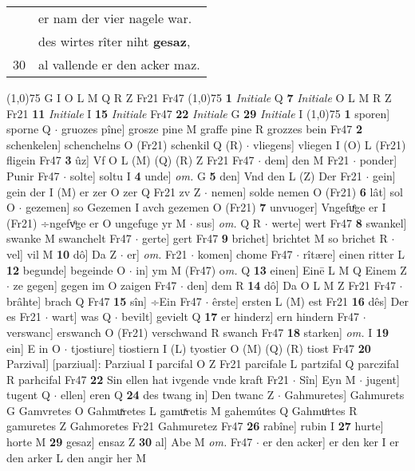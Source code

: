 \documentclass[8pt,a4paper,notitlepage]{article}
\begin{document}
\begin{table}[ht]
\begin{minipage}[t]{0.5\linewidth}
\begin{tabular}{rl}
 & er nam der vier nagele war.\\ 
 & des wirtes rîter niht \textbf{gesaz},\\ 
30 & al vallende er den acker maz.\\ 
\end{tabular}
\scriptsize
\line(1,0){75} \newline
G I O L M Q R Z Fr21 Fr47 \newline
\line(1,0){75} \newline
\textbf{1} \textit{Initiale} Q  \textbf{7} \textit{Initiale} O L M R Z Fr21  \textbf{11} \textit{Initiale} I  \textbf{15} \textit{Initiale} Fr47  \textbf{22} \textit{Initiale} G  \textbf{29} \textit{Initiale} I  \newline
\line(1,0){75} \newline
\textbf{1} sporen] sporne Q  $\cdot$ gruozes pîne] grosze pine M graffe pine R grozzes bein Fr47 \textbf{2} schenkelen] schenchelns O (Fr21) schenkil Q (R)  $\cdot$ vliegens] vliegen I (O) L (Fr21) fligein Fr47 \textbf{3} ûz] Vf O L (M) (Q) (R) Z Fr21 Fr47  $\cdot$ dem] den M Fr21  $\cdot$ ponder] Punir Fr47  $\cdot$ solte] soltu I \textbf{4} unde] \textit{om.} G \textbf{5} den] Vnd den L (Z) Der Fr21  $\cdot$ gein] gein der I (M) er zer O zer Q Fr21 zv Z  $\cdot$ nemen] solde nemen O (Fr21) \textbf{6} lât] sol O  $\cdot$ gezemen] so Gezemen I avch gezemen O (Fr21) \textbf{7} unvuoger] Vngefuͤge er I (Fr21) ÷ngefvͦge er O ungefuge yr M  $\cdot$ sus] \textit{om.} Q R  $\cdot$ werte] wert Fr47 \textbf{8} swankel] swanke M swanchelt Fr47  $\cdot$ gerte] gert Fr47 \textbf{9} brichet] brichtet M so brichet R  $\cdot$ vel] vil M \textbf{10} dô] Da Z  $\cdot$ er] \textit{om.} Fr21  $\cdot$ komen] chome Fr47  $\cdot$ rîtære] einen ritter L \textbf{12} begunde] begeinde O  $\cdot$ in] ym M (Fr47) o\textit{m. } Q \textbf{13} einen] Einē L M Q Einem Z  $\cdot$ ze gegen] gegen im O zaigen Fr47  $\cdot$ den] dem R \textbf{14} dô] Da O L M Z Fr21 Fr47  $\cdot$ brâhte] brach Q Fr47 \textbf{15} sîn] ÷Ein Fr47  $\cdot$ êrste] ersten L (M) est Fr21 \textbf{16} dês] Der es Fr21  $\cdot$ wart] was Q  $\cdot$ bevilt] gevielt Q \textbf{17} er hinderz] ern hindern Fr47  $\cdot$ verswanc] erswanch O (Fr21) verschwand R swanch Fr47 \textbf{18} starken] \textit{om.} I \textbf{19} ein] E in O  $\cdot$ tjostiure] tiostiern I (L) tyostier O (M) (Q) (R) tiost Fr47 \textbf{20} Parzival] [parziual]: Parziual I parcifal O Z Fr21 parcifale L partzifal Q parczifal R parhcifal Fr47 \textbf{22} Sin ellen hat ivgende vnde kraft Fr21  $\cdot$ Sîn] Eyn M  $\cdot$ jugent] tugent Q  $\cdot$ ellen] eren Q \textbf{24} des twang in] Den twanc Z  $\cdot$ Gahmuretes] Gahmurets G Gamvretes O Gahmuͯretes L gamuͯretis M gahemútes Q Gahmuͦrtes R gamuretes Z Gahmoretes Fr21 Gahmuretez Fr47 \textbf{26} rabîne] rubin I \textbf{27} hurte] horte M \textbf{29} gesaz] ensaz Z \textbf{30} al] Abe M \textit{om.} Fr47  $\cdot$ er den acker] er den ker I er den arker L den angir her M \newline

\end{minipage}
\end{table}
\end{document}
